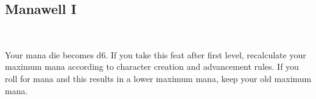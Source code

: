 \subsection*{Manawell I}\label{feat:manawell1}
 \\

Your mana die becomes d6. If you take this feat after first level, recalculate
your maximum mana according to character creation and advancement rules. If you
roll for mana and this results in a lower maximum mana, keep your old maximum
mana.

